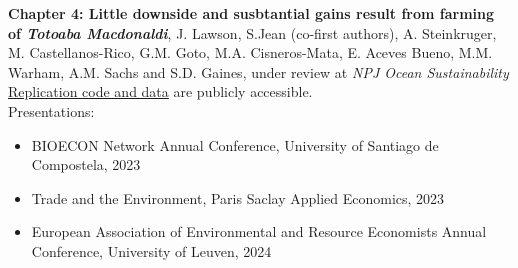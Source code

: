 %
\textbf{Chapter 4: Little downside and susbtantial gains result from farming of \textit{Totoaba Macdonaldi}}, J. Lawson, S.Jean (co-first authors), A. Steinkruger, M. Castellanos-Rico, G.M. Goto, M.A. Cisneros-Mata, E. Aceves Bueno, M.M. Warham, A.M. Sachs and S.D. Gaines,  under review at \textit{NPJ Ocean Sustainability}\\
\href{https://github.com/julawson/conservation_farming_totoaba}{Replication code and data} are publicly accessible.
%
\\
Presentations:
\begin{itemize}
\item BIOECON Network Annual Conference, University of Santiago de Compostela, 2023
\item Trade and the Environment, Paris Saclay Applied Economics, 2023
\item European Association of Environmental and Resource Economists Annual Conference, University of Leuven, 2024
\end{itemize}
%


